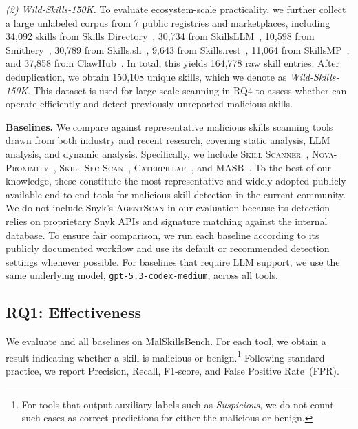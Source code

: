 \textit{(2) Wild-Skills-150K.}
To evaluate ecosystem-scale practicality, we further collect a large unlabeled corpus from 7 public registries and marketplaces, including 34,092 skills from Skills Directory~\cite{skillsdirectory}, 30,734 from SkillsLLM~\cite{skillsllm}, 10,598 from Smithery~\cite{smithery}, 30,789 from Skills.sh~\cite{skills.sh}, 9,643 from Skills.rest~\cite{skillsrest2026}, 11,064 from SkillsMP~\cite{skillsmp}, and 37,858 from ClawHub~\cite{clawhub,openclaw-skills-archive}. In total, this yields 164,778 raw skill entries. After deduplication, we obtain 150,108 unique skills, which we denote as \textit{Wild-Skills-150K}. This dataset is used for large-scale scanning in RQ4 to assess whether \toolname can operate efficiently and detect previously unreported malicious skills.

\noindent \textbf{Baselines.}
We compare \toolname against representative malicious skills scanning tools drawn from both industry and recent research, covering static analysis, LLM analysis, and dynamic analysis. Specifically, we include \textsc{Skill Scanner}~\cite{cisco-skill-scanner}, \textsc{Nova-Proximity}~\cite{roccia2026novaproximity}, \textsc{Skill-Sec-Scan}~\cite{huifer-skill-security-scan}, \textsc{Caterpillar}~\cite{alice2026caterpillar}, and \textsc{MASB}~\cite{liu2026maliciousagentskillswild}. To the best of our knowledge, these constitute the most representative and widely adopted publicly available end-to-end tools for malicious skill detection in the current community. We do not include Snyk's \textsc{AgentScan} in our evaluation because its detection relies on proprietary Snyk APIs and signature matching against the internal database. To ensure fair comparison, we run each baseline according to its publicly documented workflow and use its default or recommended detection settings whenever possible. For baselines that require LLM support, we use the same underlying model, \texttt{gpt-5.3-codex-medium}, across all tools. 

\subsection{RQ1: Effectiveness}
\label{sec:rq1}

We evaluate \toolname and all baselines on MalSkillsBench. For each tool, we obtain a result indicating whether a skill is malicious or benign.\footnote{For tools that output auxiliary labels such as \textit{Suspicious}, we do not count such cases as correct predictions for either the malicious or benign.} Following standard practice, we report Precision, Recall, F1-score, and False Positive Rate~(FPR).

